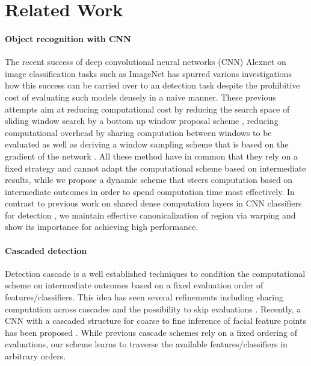 \section{Related Work}\label{sec:related}

\paragraph{Object recognition with CNN}\label{object-recognition-with-cnn}
The recent success of deep convolutional neural networks (CNN) Alexnet \cite{Krizhevsky-NIPS-2012} on image classification tasks such as ImageNet \cite{deng2009cvpr} has spurred various investigations \cite{Girshick-CVPR-2014,Zou-CVPR-2014,Simonyan-ICLR-2014,Sermanet-ICLR-2014} how this success can be carried over to an detection task despite the prohibitive cost of evaluating such models densely in a naive manner. These previous attempts aim at reducing computational cost by reducing the search space of sliding window search by a bottom up window proposal scheme \cite{Girshick-CVPR-2014}, reducing computational overhead by sharing computation between windows to be evaluated \cite{Zou-CVPR-2014,Sermanet-ICLR-2014} as well as deriving a window sampling scheme that is based on the gradient of the network \cite{Simonyan-ICLR-2014}. All these method have in common that they rely on a fixed strategy and cannot adapt the computational scheme based on intermediate results, while we propose a dynamic scheme that steers computation based on intermediate outcomes in order to spend computation time most effectively. In contrast to previous work on shared dense computation layers in CNN classifiers for detection \cite{Zou-CVPR-2014,Sermanet-ICLR-2014}, we maintain effective canonicalization of region via warping and show its importance for achieving high performance.

\paragraph{Cascaded detection}\label{cascaded-detection}
Detection cascade \cite{Viola2004,Felzenszwalb-CVPR-2010} is a well established techniques to condition the computational scheme on intermediate outcomes based on a fixed evaluation order of features/classifiers. This idea has seen several refinements including sharing computation across cascades \cite{Dollar-ECCV-2012} and the possibility to skip evaluations \cite{benbouzid12icml}. Recently, a CNN with a cascaded structure for coarse to fine inference of facial feature points has been proposed \cite{cnn_cascade}. While previous cascade schemes rely on a fixed ordering of evaluations, our scheme learns to traverse the available features/classifiers in arbitrary orders.


